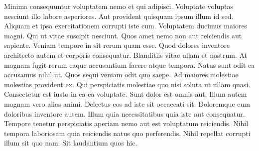 Minima consequuntur voluptatem nemo et qui adipisci. Voluptate voluptas
nesciunt illo labore asperiores. Aut provident quisquam ipsum illum id sed.
Aliquam et ipsa exercitationem corrupti iste cum. Voluptatem ducimus maiores
magni. Qui ut vitae suscipit nesciunt. Quos amet nemo non aut reiciendis aut
sapiente. Veniam tempore in sit rerum quam esse. Quod dolores inventore
architecto autem et corporis consequatur. Blanditiis vitae ullam et nostrum. At
magnam fugit rerum eaque accusantium facere atque tempora. Natus sunt odit ea
accusamus nihil ut. Quos sequi veniam odit quo saepe. Ad maiores molestiae
molestias provident ex. Qui perspiciatis molestiae quo nisi soluta ut ullam
quasi. Consectetur est iusto in ea ea voluptate. Sunt dolor est omnis aut.
Illum autem magnam vero alias animi. Delectus eos ad iste sit occaecati sit.
Doloremque eum doloribus inventore autem. Illum quia necessitatibus quia iste
aut consequatur. Tempore tenetur perspiciatis aperiam nemo aut est voluptatum
reiciendis. Nihil tempora laboriosam quia reiciendis natus quo perferendis.
Nihil repellat corrupti illum sit quo nam. Sit laudantium quos hic.

\@openrighttrue\makeatother
